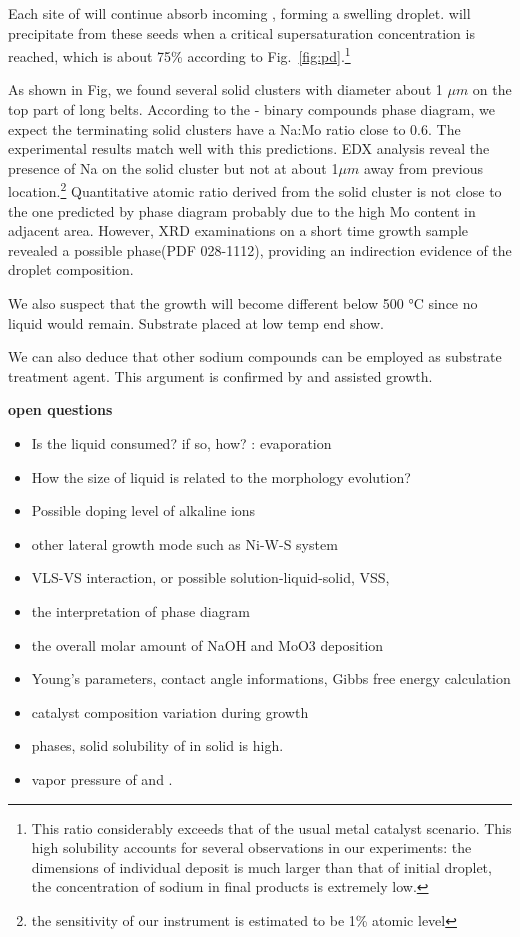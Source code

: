 Each site of  will continue absorb incoming , forming a swelling droplet.  will precipitate from these seeds when a critical supersaturation concentration is reached, which is about 75\% according to Fig.~\ref{fig:pd}.\footnote{This ratio considerably exceeds that of the usual metal catalyst scenario. This high solubility accounts for several observations in our experiments: the dimensions of individual deposit is much larger than that of initial droplet, the concentration of sodium in final products is extremely low.}

As shown in Fig, we found several solid clusters with diameter about 1 $\mu m$ on the top part of long belts. According to the - binary compounds phase diagram, we expect the terminating solid clusters have a Na:Mo ratio close to 0.6. The experimental results match well with this predictions. EDX analysis reveal the presence of Na on the solid cluster but not at about 1$\mu m$ away from previous location.\footnote{the sensitivity of our instrument is estimated to be 1\% atomic level} Quantitative atomic ratio derived from the solid cluster is not close to the one predicted by phase diagram probably due to the high Mo content in adjacent area. However, XRD examinations on a short time growth sample revealed a possible  phase(PDF 028-1112), providing an indirection evidence of the droplet composition.

We also suspect that the growth will become different below 500 \si{\degreeCelsius} since no liquid would remain. Substrate placed at low temp end show.

We can also deduce that other sodium compounds can be employed as substrate treatment agent. This argument is confirmed by  and  assisted growth.


\textbf{open questions}
\begin{itemize}
\item Is the liquid consumed? if so, how? : evaporation
\item How the size of liquid is related to the morphology evolution?
\item Possible doping level of alkaline ions
\item other lateral growth mode such as Ni-W-S system
\item VLS-VS interaction, or possible solution-liquid-solid, VSS,
\item the interpretation of phase diagram
\item the overall molar amount of NaOH and MoO3 deposition
\item Young's parameters, contact angle informations, Gibbs free energy calculation
\item catalyst composition variation during growth
\item {} phases, solid solubility of  in solid  is high.
\item vapor pressure of  and .
\end{itemize}

